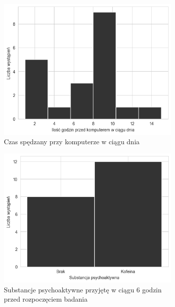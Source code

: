 \documentclass{./assets/wfis}
\begin{document}
\begin{figure}[h!]
\begin{subfigure}[b]{0.45\textwidth}
    \centering
    \includegraphics[width=\columnwidth]{thesis/assets/computer_time.png}
    \caption{Czas spędzany przy komputerze w ciągu dnia}
    \label{fig:computer-time}
\end{subfigure}   
\hfill
\begin{subfigure}[b]{0.45\textwidth}
    \centering
    \includegraphics[width=\columnwidth]{thesis/assets/psychoactive_substance.png}
    \caption{Substancje psychoaktywne przyjętę w ciągu 6 godzin przed rozpoczęciem badania}
    \label{fig:psychoactive-substances}
\end{subfigure}
\begin{subfigure}[b]{\textwidth}
\centering

\end{subfigure}
\end{figure}
\end{document}
